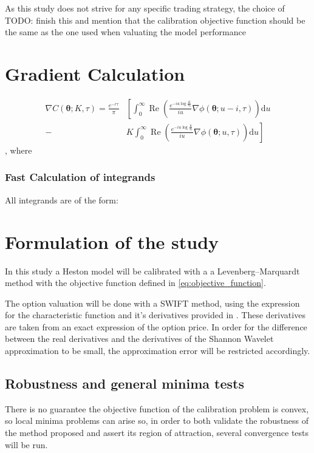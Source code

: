 \documentclass[12,twoside]{mammeTFM}
\theoremstyle{definition}
\theoremstyle{remark}
\begin{document}
As this study does not strive for any specific trading strategy, the choice of TODO: finish this and mention that the calibration objective function should be the same as the one used when valuating the model performance \cite{chr02}


\section{Gradient Calculation} \label{sec:gradient}

\begin{equation}
\begin{aligned}
\nabla C(\boldsymbol{\theta} ; K, \tau)=\frac{e^{-r \tau}}{\pi} &\left[\int_{0}^{\infty} \operatorname{Re}\left(\frac{e^{-i u \log \frac{K}{s_{0}}}}{i u} \nabla \phi(\boldsymbol{\theta} ; u-i, \tau)\right) \mathrm{d} u\right.\\
-&\left.K \int_{0}^{\infty} \operatorname{Re}\left(\frac{e^{-i u \log \frac{K}{s_{0}}}}{i u} \nabla \phi(\boldsymbol{\theta} ; u, \tau)\right) \mathrm{d} u\right]
\end{aligned}
\end{equation}
, where 

\subsubsection{Fast Calculation of integrands}
All integrands are of the form: %

\section{Formulation of the study}

In this study a Heston model will be calibrated with a a Levenberg–Marquardt method with the objective function defined in \ref{eq:objective_function}. 

The option valuation will be done with a SWIFT method, using the expression for the characteristic function and it's derivatives provided in \cite{cui17}. These derivatives are taken from an exact expression of the option price. In order for the difference between the real derivatives and the derivatives of the Shannon Wavelet approximation to be small, the approximation error will be restricted accordingly.

\subsection{Robustness and general minima tests}
There is no guarantee the objective function of the calibration problem is convex, so local minima problems can arise so, in order to both validate the robustness of the method proposed and assert its region of attraction, several convergence tests will be run.
\end{document}
